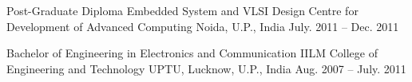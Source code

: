 
\begin{cventries}
  \cventry
    {Post-Graduate Diploma Embedded System and VLSI Design} %
    {Centre for Development of Advanced Computing} %
    {Noida, U.P., India} %
    {July. 2011 -- Dec. 2011} %
    {}
    
  \cventry
    {Bachelor of Engineering in Electronics and Communication} %
    {IILM College of Engineering and Technology} %
    {UPTU, Lucknow, U.P., India} %
    {Aug. 2007 -- July. 2011} %
    {}


\end{cventries}
